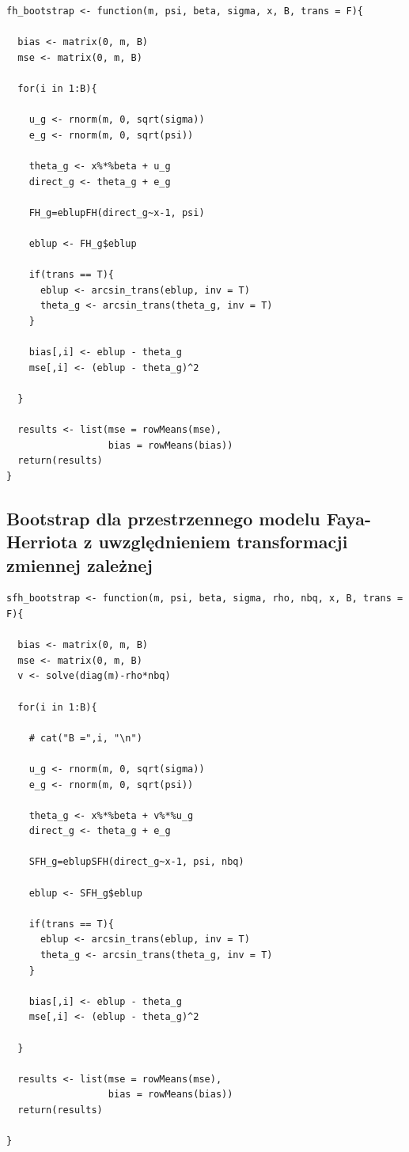 \begin{verbatim}
fh_bootstrap <- function(m, psi, beta, sigma, x, B, trans = F){

  bias <- matrix(0, m, B)
  mse <- matrix(0, m, B)
  
  for(i in 1:B){
    
    u_g <- rnorm(m, 0, sqrt(sigma))
    e_g <- rnorm(m, 0, sqrt(psi))
     
    theta_g <- x%*%beta + u_g
    direct_g <- theta_g + e_g
    
    FH_g=eblupFH(direct_g~x-1, psi)
    
    eblup <- FH_g$eblup
    
    if(trans == T){
      eblup <- arcsin_trans(eblup, inv = T)
      theta_g <- arcsin_trans(theta_g, inv = T)
    }
    
    bias[,i] <- eblup - theta_g
    mse[,i] <- (eblup - theta_g)^2
    
  }
  
  results <- list(mse = rowMeans(mse),
                  bias = rowMeans(bias))
  return(results) 
}
\end{verbatim}

\subsection*{Bootstrap dla przestrzennego modelu Faya-Herriota z uwzględnieniem transformacji zmiennej zależnej}

\begin{verbatim}
sfh_bootstrap <- function(m, psi, beta, sigma, rho, nbq, x, B, trans = F){
    
  bias <- matrix(0, m, B)
  mse <- matrix(0, m, B)
  v <- solve(diag(m)-rho*nbq)
  
  for(i in 1:B){
    
    # cat("B =",i, "\n")
    
    u_g <- rnorm(m, 0, sqrt(sigma))
    e_g <- rnorm(m, 0, sqrt(psi))
    
    theta_g <- x%*%beta + v%*%u_g
    direct_g <- theta_g + e_g
     
    SFH_g=eblupSFH(direct_g~x-1, psi, nbq)
       
    eblup <- SFH_g$eblup
    
    if(trans == T){
      eblup <- arcsin_trans(eblup, inv = T)
      theta_g <- arcsin_trans(theta_g, inv = T)
    }
    
    bias[,i] <- eblup - theta_g
    mse[,i] <- (eblup - theta_g)^2
    
  }
  
  results <- list(mse = rowMeans(mse),
                  bias = rowMeans(bias))
  return(results)
  
}
\end{verbatim}

